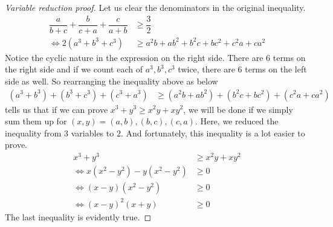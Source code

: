 \documentclass{subfile}
\begin{document}
		\begin{proof}[\itshape {}Variable reduction proof]
			Let us clear the denominators in the original inequality.
				\begin{align*}
					\dfrac{a}{b+c}+\dfrac{b}{c+a}+\dfrac{c}{a+b}
						& \geq\dfrac{3}{2}\\
					\iff2(a^3+b^3+c^3)
						& \geq a^2b+ab^2+b^2c+bc^2+c^2a+ca^2
				\end{align*}
			Notice the cyclic nature in the expression on the right side. There are $6$ terms on the right side and if we count each of $a^3,b^3,c^3$ twice, there are $6$ terms on the left side as well. So rearranging the inequality above as below
				\begin{align*}
					(a^3+b^3)+(b^3+c^3)+(c^3+a^3)
						& \geq (a^2b+ab^2)+(b^2c+bc^2)+(c^2a+ca^2)
				\end{align*}
			tells us that if we can prove $x^3+y^3\geq x^2y+xy^2$, we will be done if we simply sum them up for $(x,y)=(a,b),(b,c),(c,a)$. Here, we reduced the inequality from $3$ variables to $2$. And fortunately, this inequality is a lot easier to prove.
				\begin{align*}
					x^3+y^3
						& \geq x^2y+xy^2\\
					\iff x(x^2-y^2)-y(x^2-y^2)
						& \geq0\\
					\iff (x-y)(x^2-y^2)
						& \geq0\\
					\iff(x-y)^2(x+y)
						& \geq0
				\end{align*}
			The last inequality is evidently true.
		\end{proof}
	
\end{document}

